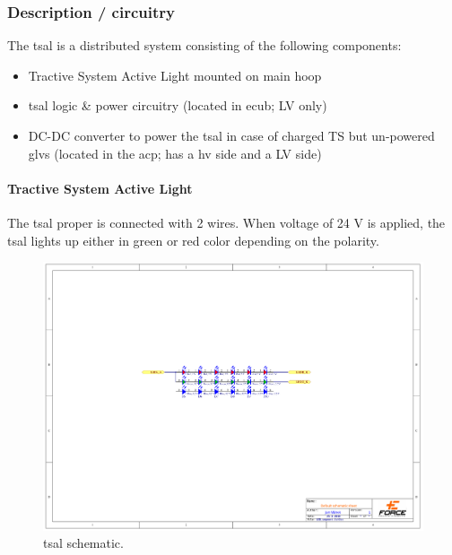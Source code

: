 \subsubsection{Description / circuitry}

The \gls{tsal} is a distributed system consisting of the following components:
\begin{itemize}
\item Tractive System Active Light mounted on main hoop
\item \gls{tsal} logic \& power circuitry (located in \gls{ecub}; LV only)
\item DC-DC converter to power the \gls{tsal} in case of charged TS but un-powered \gls{glvs} (located in the \gls{acp}; has a \gls{hv} side and a LV side)
\end{itemize}

\paragraph{Tractive System Active Light}

The \gls{tsal} proper is connected with 2 wires. When voltage of 24 V is applied, the \gls{tsal} lights up either in green or red color depending on the polarity.

\begin{figure}[H]
	\centering
	\includegraphics[width=\textwidth,trim={6cm 10cm 6cm 7cm},clip]{./img/TSAL-schematic.pdf}
	\caption{\Gls{tsal} schematic.}
	\label{fig:TSAL-schematic}
\end{figure}


